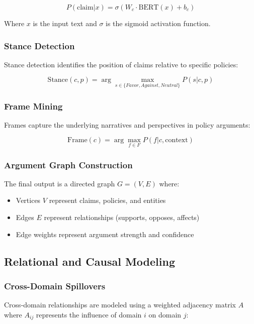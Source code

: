 \documentclass[conference]{IEEEtran}
\begin{document}
\begin{equation}
P(\text{claim}|x) = \sigma(W_c \cdot \text{BERT}(x) + b_c)
\end{equation}

Where $x$ is the input text and $\sigma$ is the sigmoid activation function.

\subsubsection{Stance Detection}
Stance detection identifies the position of claims relative to specific policies:

\begin{equation}
\text{Stance}(c, p) = \arg\max_{s \in \{Favor, Against, Neutral\}} P(s|c, p)
\end{equation}

\subsubsection{Frame Mining}
Frames capture the underlying narratives and perspectives in policy arguments:

\begin{equation}
\text{Frame}(c) = \arg\max_{f \in F} P(f|c, \text{context})
\end{equation}

\subsubsection{Argument Graph Construction}
The final output is a directed graph $G = (V, E)$ where:
\begin{itemize}
    \item Vertices $V$ represent claims, policies, and entities
    \item Edges $E$ represent relationships (supports, opposes, affects)
    \item Edge weights represent argument strength and confidence
\end{itemize}

\subsection{Relational and Causal Modeling}

\subsubsection{Cross-Domain Spillovers}
Cross-domain relationships are modeled using a weighted adjacency matrix $A$ where $A_{ij}$ represents the influence of domain $i$ on domain $j$:
\end{document}
